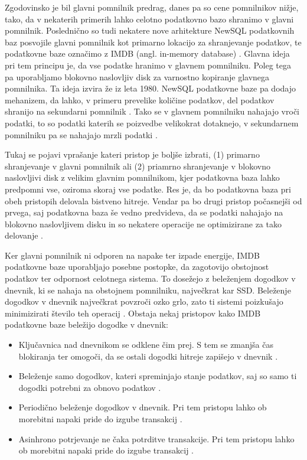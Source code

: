 \documentclass[a4paper, 12pt]{book}
\begin{document}
Zgodovinsko je bil glavni pomnilnik predrag, danes pa so cene pomnilnikov nižje, tako, da v nekaterih primerih lahko celotno podatkovno bazo shranimo v glavni pomnilnik. Poslednično so tudi nekatere nove arhitekture NewSQL podatkovnih baz posvojile glavni pomnilnik kot primarno lokacijo za shranjevanje podatkov, te podatkovne baze označimo z IMDB (angl. in-memory database) \cite{NewSqlInMemoryAnalytics}. Glavna ideja pri tem principu je, da vse podatke hranimo v glavnem pomnilniku. Poleg tega pa uporabljamo blokovno naslovljiv disk za varnostno kopiranje glavnega pomnilnika. Ta ideja izvira že iz leta 1980.
NewSQL podatkovne baze pa dodajo mehanizem, da lahko, v primeru prevelike količine podatkov, del podatkov shranijo na sekundarni pomnilnik \cite{Pavlo2016Sep}. Tako se v glavnem pomnilniku nahajajo vroči podatki, to so podatki katerih se po\-iz\-ved\-be velikokrat dotaknejo, v sekundarnem pomnilniku pa se nahajajo mrzli podatki \cite{NewSqlInMemoryAnalytics}.

Tukaj se pojavi vprašanje kateri pristop je boljše izbrati, (1) primarno shranjevanje v glavni pomnilnik ali (2) priamrno shranjevanje v blokovno naslovljivi disk z velikim glavnim pomnilnikom, kjer podatkovna baza lahko predpomni vse, oziroma skoraj vse podatke. Res je, da bo podatkovna baza pri obeh pristopih delovala bistveno hitreje. Vendar pa bo drugi pristop počasnejši od prvega, saj podatkovna baza še vedno predvideva, da se podatki nahajajo na blokovno naslovljivem disku in so nekatere operacije ne optimizirane za tako delovanje \cite{garcia1992main}.

Ker glavni pomnilnik ni odporen na napake ter izpade energije, IMDB podatkovne baze uporabljajo posebne postopke, da zagotovijo obstojnost podatkov ter odpornost celotnega sistema. To dosežejo z beleženjem dogodkov v dnevnik, ki se nahaja na obstojnem pomnilniku, največkrat kar SSD. Beleženje dogodkov v dnevnik največkrat povzroči ozko grlo, zato ti sistemi poizkušajo minimizirati število teh operacij \cite{MainMemoryDatabaseSystems}. Obstaja nekaj pristopov kako IMDB podatkovne baze beležijo dogodke v dnevnik:

\begin{itemize}
    \item Ključavnica nad dnevnikom se odklene čim prej. S tem se zmanjša čas blokiranja ter omogoči, da se ostali dogodki hitreje zapišejo v dnevnik \cite{NewSqlInMemoryAnalytics}. 
    \item Beleženje samo dogodkov, kateri spreminjajo stanje podatkov, saj so samo ti dogodki potrebni za obnovo podatkov \cite{MainMemoryDatabaseSystems}. 
    \item Periodično beleženje dogodkov v dnevnik. Pri tem pristopu lahko ob morebitni napaki pride do izgube transakcij \cite{NewSqlInMemoryAnalytics}.  
    \item Asinhrono potrjevanje ne čaka potrditve transakcije. Pri tem pristopu lahko ob morebitni napaki pride do izgube transakcij \cite{NewSqlInMemoryAnalytics}. 
\end{itemize}
\end{document}
